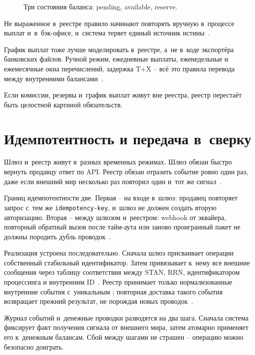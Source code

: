 \begin{figure}[tbp]
  \centering
  \caption{Три состояния баланса: pending, available, reserve.}\label{fig:balance-states}
\end{figure}

Не выраженное в~реестре правило начинают повторять вручную
в~процессе выплат и~в~бэк-офисе, и~система теряет единый источник
истины~\cite{stripe-minimum-balances,adyen-balances}.

График выплат тоже лучше моделировать в~реестре, а~не в~коде
экспортёра банковских файлов. Ручной режим, ежедневные выплаты,
еженедельные и ежемесячные окна перечислений, задержка T+X --
всё это правила перевода между внутренними балансами~\cite{stripe-payouts}.

Если комиссии, резервы и~график выплат живут вне реестра, реестр
перестаёт быть целостной картиной обязательств.

\section{Идемпотентность и передача в~сверку}\label{sec:ledger-idempotency}

Шлюз и~реестр живут в~разных временных режимах. Шлюз обязан быстро
вернуть продавцу ответ по API. Реестр обязан отразить событие ровно
один раз, даже если внешний мир несколько раз повторил один и~тот же
сигнал~\cite{stripe-idempotency,adyen-api-idempotency}.

Границ идемпотентности две. Первая -- на входе в~шлюз: продавец
повторяет запрос с~тем же \texttt{idempotency-key}, и~шлюз не должен
создать вторую авторизацию. Вторая -- между шлюзом и~реестром:
webhook от эквайера, повторный обратный вызов после тайм-аута или
заново проигранный пакет не должны породить дубль
проводок~\cite{stripe-idempotency,adyen-api-idempotency,stripe-webhooks}.

Реализация устроена последовательно. Сначала шлюз присваивает
операции собственный стабильный идентификатор. Затем привязывает
к~нему все внешние сообщения через таблицу соответствия между STAN,
RRN, идентификатором процессинга и внутренним
ID~\cite{fis-iso8583-guide-2023}. Реестр принимает только
нормализованные внутренние события с~уникальным ;
повторная доставка такого события возвращает прежний результат,
не порождая новых проводок~\cite{stripe-webhooks}.

Журнал событий и~денежные проводки разводятся на два шага. Сначала
система фиксирует факт получения сигнала от внешнего мира, затем
атомарно применяет его к~денежным балансам. Сбой между шагами
не страшен -- операцию можно безопасно доиграть.

